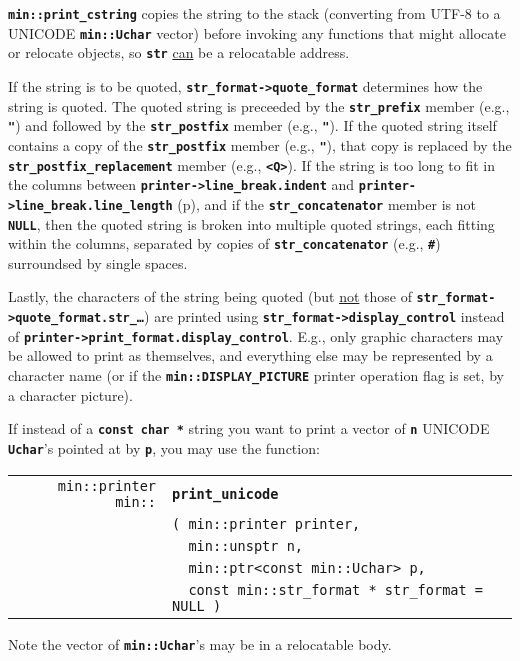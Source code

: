 \documentclass[12pt]{article}
\makeatletter
\newcommand{\TT}[1]{{\tt \bfseries #1}}
\newcommand{\ttindex}[1]{\index{#1@{\tt #1}}}
\newcommand{\pagref}[1]{p\pageref{#1}}
\newcommand{\EOL}{\penalty \exhyphenpenalty}
\newenvironment{indpar}[1][0.3in]%
	{\begin{list}{}%
		     {\setlength{\itemsep}{0in}%
		      \setlength{\topsep}{0in}%
		      \setlength{\parsep}{1ex}%
		      \setlength{\labelwidth}{#1}%
		      \setlength{\leftmargin}{#1}%
		      \addtolength{\leftmargin}{\labelsep}}%
	 \item}%
	{\end{list}}
\newcommand{\LABEL}[1]{\label{#1}}
\newlength{\ARGBREAKLENGTH}
\newcommand{\ARGBREAK}[1][\ARGBREAKLENGTH]{\\&\hspace*{#1}}
\newcommand{\MINKEY}[1]%
	   {\TT{#1}\ttindex{min::#1}\ttindex{#1}}
\makeatother
\begin{document}
\TT{min::print\_cstring} copies the string to the stack (converting from
UTF-8 to a UNICODE \TT{min::\EOL Uchar} vector) before invoking
any functions that might allocate or relocate objects, so \TT{str}
\underline{can} be a relocatable address.


If the string is to be quoted, \TT{str\_format->quote\_format}
determines how the string is quoted.  The quoted string is preceeded
by the \TT{str\_\EOL prefix} member (e.g., \TT{"}) and followed by the
\TT{str\_\EOL postfix} member (e.g., \TT{"}).  If the quoted string itself
contains a copy of the \TT{str\_\EOL postfix} member (e.g., \TT{"}),
that copy is replaced by the \TT{str\_\EOL postfix\_\EOL replacement}
member (e.g., \TT{<Q>}).  If the string is too long to fit in the
columns between \TT{printer->\EOL line\_\EOL break.indent}
and \TT{printer->\EOL line\_\EOL break.line\_\EOL length}
(\pagref{LINE-LENGTH}), and if
the \TT{str\_\EOL concatenator} member is not \TT{NULL}, then
the quoted string is broken into multiple quoted strings, each
fitting within the columns, separated by copies of
\TT{str\_\EOL concatenator} (e.g., \TT{\#})
surroundsed by single spaces.

Lastly, the characters of the string being quoted (but \underline{not}
those of \TT{str\_\EOL format->\EOL quote\_\EOL format.str\_\ldots})
are printed using \TT{str\_\EOL format->\EOL display\_\EOL control}
instead of \TT{printer->\EOL print\_\EOL format.display\_\EOL control}.
E.g., only graphic characters may be allowed to print as themselves,
and everything else may be represented by a character name
(or if the \TT{min::\EOL DISPLAY\_\EOL PICTURE} printer operation
flag is set, by a character picture).

If instead of a \TT{const char *} string you want to print a vector
of \TT{n} UNICODE \TT{Uchar}'s pointed at by \TT{p}, you may use the
function:

\begin{indpar}[1em]\begin{tabular}{r@{}l}
\verb|min::printer min::| & \MINKEY{print\_unicode}\ARGBREAK
    \verb|( min::printer printer,|\ARGBREAK
    \verb|  min::unsptr n,|\ARGBREAK
    \verb|  min::ptr<const min::Uchar> p,|\ARGBREAK
    \verb|  const min::str_format * str_format = NULL )|
\LABEL{MIN::PRINT_UNICODE} \\
\end{tabular}\end{indpar}

Note the vector of \TT{min::Uchar}'s may be in a relocatable body.
\end{document}
